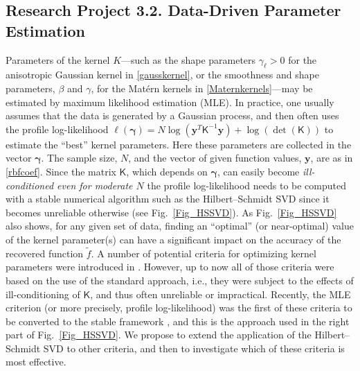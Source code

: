 \documentclass[11pt]{NSFamsart}
\newcommand{\tf}{\tilde{f}}
\newcommand{\mK}{\mathsf{K}}
\newcommand{\by}{{\boldsymbol{y}}}
\newcommand{\bgamma}{{\boldsymbol{\gamma}}}
\begin{document}
\subsection*{Research Project 3.2. Data-Driven Parameter Estimation} \label{parestsubsec}
Parameters of the kernel $K$---such as the shape parameters $\gamma_\ell>0$ for the anisotropic Gaussian kernel in \eqref{gausskernel}, or the smoothness and shape parameters, $\beta$ and $\gamma$, for the Mat\'ern kernels in \eqref{Maternkernels}---may be estimated by maximum likelihood estimation (MLE).  In practice, one usually assumes that the data is generated by a Gaussian process, and then often uses the profile log-likelihood $\ell(\bgamma) = N\log(\by^T\mK^{-1}\by) + \log(\det(\mK))$ to estimate the ``best'' kernel parameters. Here these parameters are collected in the vector $\bgamma$.  The sample size, $N$, and the vector of given function values, $\by$, are as in \eqref{rbfcoef}. Since the matrix $\mK$, which depends on $\bgamma$, can easily become \emph{ill-conditioned even for moderate $N$} the profile log-likelihood needs to be computed with a stable numerical algorithm such as the Hilbert--Schmidt SVD since it becomes unreliable otherwise (see Fig.~\ref{Fig_HSSVD}).
As Fig.~\ref{Fig_HSSVD} also shows, for any given set of data, finding an ``optimal'' (or near-optimal) value of the kernel parameter(s) can have a significant impact on the accuracy of the recovered function $\tf$. A number of potential criteria for optimizing kernel parameters were introduced in \citep{Fasshauer11}. However, up to now all of those criteria were based on the use of the standard approach, i.e., they were subject to the effects of ill-conditioning of $\mK$, and thus often unreliable or impractical. Recently, the MLE criterion (or more precisely, profile log-likelihood) was the first of these criteria to be converted to the stable framework \citep{McCourtFas14}, and this is the approach used in the right part of Fig.~\ref{Fig_HSSVD}. We propose to extend the application of the Hilbert--Schmidt SVD to other criteria, and then to investigate which of these criteria is most effective.
\end{document}
